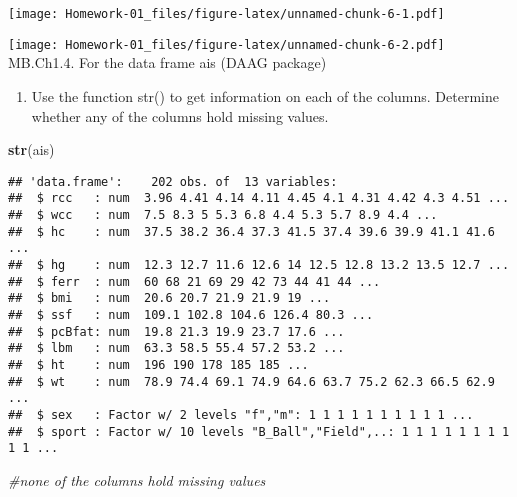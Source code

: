 \documentclass[
]{article}
\newenvironment{Shaded}{\begin{snugshade}}{\end{snugshade}}
\newcommand{\CommentTok}[1]{\textcolor[rgb]{0.56,0.35,0.01}{\textit{#1}}}
\newcommand{\KeywordTok}[1]{\textcolor[rgb]{0.13,0.29,0.53}{\textbf{#1}}}
\newcommand{\NormalTok}[1]{#1}
\newcommand{\OperatorTok}[1]{\textcolor[rgb]{0.81,0.36,0.00}{\textbf{#1}}}
\providecommand{\tightlist}{%
  \setlength{\itemsep}{0pt}\setlength{\parskip}{0pt}}
\begin{document}
\texttt{[image: Homework-01\_files/figure-latex/unnamed-chunk-6-1.pdf]}

\begin{Shaded}
\end{Shaded}

\texttt{[image: Homework-01\_files/figure-latex/unnamed-chunk-6-2.pdf]}
MB.Ch1.4. For the data frame ais (DAAG package)

\begin{enumerate}
\def\labelenumi{(\alph{enumi})}
\tightlist
\item
  Use the function str() to get information on each of the columns.
  Determine whether any of the columns hold missing values.
\end{enumerate}

\begin{Shaded}
\begin{Highlighting}[]
\KeywordTok{str}\NormalTok{(ais)}
\end{Highlighting}
\end{Shaded}

\begin{verbatim}
## 'data.frame':    202 obs. of  13 variables:
##  $ rcc   : num  3.96 4.41 4.14 4.11 4.45 4.1 4.31 4.42 4.3 4.51 ...
##  $ wcc   : num  7.5 8.3 5 5.3 6.8 4.4 5.3 5.7 8.9 4.4 ...
##  $ hc    : num  37.5 38.2 36.4 37.3 41.5 37.4 39.6 39.9 41.1 41.6 ...
##  $ hg    : num  12.3 12.7 11.6 12.6 14 12.5 12.8 13.2 13.5 12.7 ...
##  $ ferr  : num  60 68 21 69 29 42 73 44 41 44 ...
##  $ bmi   : num  20.6 20.7 21.9 21.9 19 ...
##  $ ssf   : num  109.1 102.8 104.6 126.4 80.3 ...
##  $ pcBfat: num  19.8 21.3 19.9 23.7 17.6 ...
##  $ lbm   : num  63.3 58.5 55.4 57.2 53.2 ...
##  $ ht    : num  196 190 178 185 185 ...
##  $ wt    : num  78.9 74.4 69.1 74.9 64.6 63.7 75.2 62.3 66.5 62.9 ...
##  $ sex   : Factor w/ 2 levels "f","m": 1 1 1 1 1 1 1 1 1 1 ...
##  $ sport : Factor w/ 10 levels "B_Ball","Field",..: 1 1 1 1 1 1 1 1 1 1 ...
\end{verbatim}

\begin{Shaded}
\begin{Highlighting}[]
\CommentTok{#none of the columns hold missing values}
\end{Highlighting}
\end{Shaded}
\end{document}
